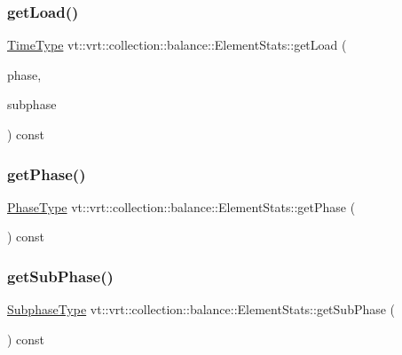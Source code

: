 \subsubsection{\texorpdfstring{get\+Load()}{getLoad()}\hspace{0.1cm}{\footnotesize\ttfamily [2/2]}}
{\footnotesize\ttfamily \hyperlink{namespacevt_a876a9d0cd5a952859c72de8a46881442}{Time\+Type} vt\+::vrt\+::collection\+::balance\+::\+Element\+Stats\+::get\+Load (\begin{DoxyParamCaption}\item[{\hyperlink{namespacevt_a46ce6733d5cdbd735d561b7b4029f6d7}{Phase\+Type}}]{phase,  }\item[{\hyperlink{namespacevt_ae78cbfdf1e57470e33eedb074f2beeba}{Subphase\+Type}}]{subphase }\end{DoxyParamCaption}) const}

\mbox{\label{structvt_1_1vrt_1_1collection_1_1balance_1_1_element_stats_a24fcc0af9fb6017b556828a52431bc1c}} 
\subsubsection{\texorpdfstring{get\+Phase()}{getPhase()}}
{\footnotesize\ttfamily \hyperlink{namespacevt_a46ce6733d5cdbd735d561b7b4029f6d7}{Phase\+Type} vt\+::vrt\+::collection\+::balance\+::\+Element\+Stats\+::get\+Phase (\begin{DoxyParamCaption}{ }\end{DoxyParamCaption}) const}

\mbox{\label{structvt_1_1vrt_1_1collection_1_1balance_1_1_element_stats_aa6876c8014bf0b9c9bf0061ed70ad721}} 
\subsubsection{\texorpdfstring{get\+Sub\+Phase()}{getSubPhase()}}
{\footnotesize\ttfamily \hyperlink{namespacevt_ae78cbfdf1e57470e33eedb074f2beeba}{Subphase\+Type} vt\+::vrt\+::collection\+::balance\+::\+Element\+Stats\+::get\+Sub\+Phase (\begin{DoxyParamCaption}{ }\end{DoxyParamCaption}) const}

